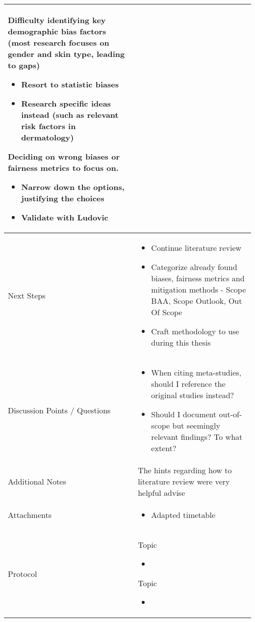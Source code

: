 \documentclass[a4paper,11pt]{article}
\begin{document}
\begin{longtable}{|p{3.5cm}|p{12cm}|}
	    Difficulty identifying key demographic bias factors (most research focuses on gender and skin type, leading to gaps)
		\begin{itemize}
			\item Resort to statistic biases
			\item Research specific ideas instead (such as relevant risk factors in dermatology)
		\end{itemize}
		
		Deciding on wrong biases or fairness metrics to focus on.
		\begin{itemize}
			\item Narrow down the options, justifying the choices
			\item Validate with Ludovic
		\end{itemize}
		
		\\
		\hline
		Next Steps & \begin{itemize}
			\item Continue literature review
			\item Categorize already found biases, fairness metrics and mitigation methods - Scope BAA, Scope Outlook, Out Of Scope
			\item Craft methodology to use during this thesis
		\end{itemize} \\
		\hline
		Discussion Points / Questions & \begin{itemize}
			\item When citing meta-studies, should I reference the original studies instead?
			\item Should I document out-of-scope but seemingly relevant findings? To what extent?
		\end{itemize} \\
		\hline
		Additional Notes & The hints regarding how to literature review were very helpful advise\\
		\hline
		Attachments  & \begin{itemize}
			\item Adapted timetable
		\end{itemize} \\
		\hline
		Protocol  & 
		Topic
		\begin{itemize}
			\item 
		\end{itemize}
		
		Topic
		\begin{itemize}
			\item 
		\end{itemize} \\
		\hline
	\end{longtable}
	
\end{document}
